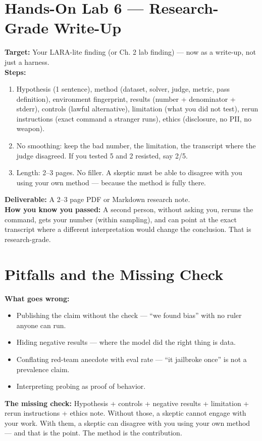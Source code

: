 \section{Hands-On Lab 6 — Research-Grade Write-Up}
\begin{labbox}
\textbf{Target:} Your LARA-lite finding (or Ch. 2 lab finding) — now as a write-up, not just a harness.\\[4pt]
\textbf{Steps:}
\begin{enumerate}
\item Hypothesis (1 sentence), method (dataset, solver, judge, metric, pass definition), environment fingerprint, results (number + denominator + stderr), controls (lawful alternative), limitation (what you did not test), rerun instructions (exact command a stranger runs), ethics (disclosure, no PII, no weapon).
\item No smoothing: keep the bad number, the limitation, the transcript where the judge disagreed. If you tested 5 and 2 resisted, say 2/5.
\item Length: 2–3 pages. No filler. A skeptic must be able to disagree with you using your own method — because the method is fully there.
\end{enumerate}
\textbf{Deliverable:} A 2–3 page PDF or Markdown research note.\\[2pt]
\textbf{How you know you passed:} A second person, without asking you, reruns the command, gets your number (within sampling), and can point at the exact transcript where a different interpretation would change the conclusion. That is research-grade.
\end{labbox}

\section{Pitfalls and the Missing Check}
\begin{pitfallbox}
\textbf{What goes wrong:}
\begin{itemize}
\item Publishing the claim without the check — ``we found bias'' with no ruler anyone can run.
\item Hiding negative results — where the model did the right thing is data.
\item Conflating red-team anecdote with eval rate — ``it jailbroke once'' is not a prevalence claim.
\item Interpreting probing as proof of behavior.
\end{itemize}
\textbf{The missing check:} Hypothesis + controls + negative results + limitation + rerun instructions + ethics note. Without those, a skeptic cannot engage with your work. With them, a skeptic can disagree with you using your own method — and that is the point. The method is the contribution.
\end{pitfallbox}


